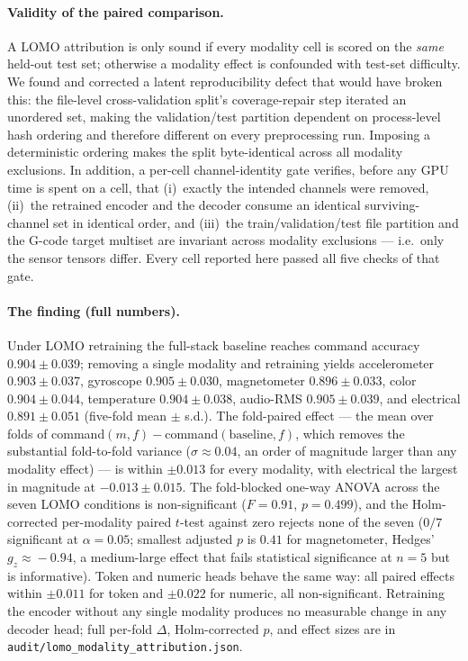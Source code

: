 \documentclass[11pt,a4paper]{article}
\begin{document}
\paragraph{Validity of the paired comparison.} A LOMO attribution is only
sound if every modality cell is scored on the \emph{same} held-out test set;
otherwise a modality effect is confounded with test-set difficulty. We found
and corrected a latent reproducibility defect that would have broken this: the
file-level cross-validation split's coverage-repair step iterated an unordered
set, making the validation/test partition dependent on process-level hash
ordering and therefore different on every preprocessing run. Imposing a
deterministic ordering makes the split byte-identical across all modality
exclusions. In addition, a per-cell channel-identity gate verifies, before any
GPU time is spent on a cell, that (i)~exactly the intended channels were
removed, (ii)~the retrained encoder and the decoder consume an identical
surviving-channel set in identical order, and (iii)~the train/validation/test
file partition and the G-code target multiset are invariant across modality
exclusions --- i.e.\ only the sensor tensors differ. Every cell reported here
passed all five checks of that gate.

\paragraph{The finding (full numbers).} Under LOMO retraining the full-stack baseline reaches
command accuracy $0.904 \pm 0.039$; removing a single modality and retraining
yields accelerometer $0.903 \pm 0.037$, gyroscope $0.905 \pm 0.030$,
magnetometer $0.896 \pm 0.033$, color $0.904 \pm 0.044$, temperature
$0.904 \pm 0.038$, audio-RMS $0.905 \pm 0.039$, and electrical
$0.891 \pm 0.051$ (five-fold mean $\pm$ s.d.). The fold-paired effect ---
the mean over folds of command$(m,f)-$command$(\text{baseline},f)$, which
removes the substantial fold-to-fold variance ($\sigma \approx 0.04$, an order
of magnitude larger than any modality effect) --- is within $\pm 0.013$ for
every modality, with electrical the largest in magnitude at
$-0.013 \pm 0.015$. The fold-blocked one-way ANOVA across the seven LOMO
conditions is non-significant ($F=0.91$, $p=0.499$), and the Holm-corrected
per-modality paired $t$-test against zero rejects none of the seven
($0/7$ significant at $\alpha=0.05$; smallest adjusted $p$ is $0.41$ for
magnetometer, Hedges' $g_{z}\!\approx\!-0.94$, a medium-large effect that
fails statistical significance at $n\!=\!5$ but is informative). Token and numeric heads behave the same way: all paired
effects within $\pm 0.011$ for token and $\pm 0.022$ for numeric, all
non-significant. Retraining the encoder without any single modality
produces no measurable change in any decoder head;
full per-fold $\Delta$, Holm-corrected $p$, and effect sizes are in
\texttt{audit/lomo\_modality\_attribution.json}.
\end{document}
